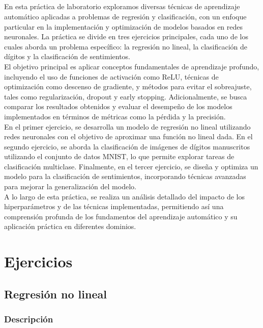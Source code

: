\documentclass{report}
\begin{document}
    \paragraph*{}
    {
      En esta práctica de laboratorio exploramos diversas técnicas de aprendizaje automático aplicadas a problemas de regresión y clasificación, con un enfoque particular en la implementación y optimización de modelos basados en redes neuronales. La práctica se divide en tres ejercicios principales, cada uno de los cuales aborda un problema específico: la regresión no lineal, la clasificación de dígitos y la clasificación de sentimientos.\\

      El objetivo principal es aplicar conceptos fundamentales de aprendizaje profundo, incluyendo el uso de funciones de activación como ReLU, técnicas de optimización como descenso de gradiente, y métodos para evitar el sobreajuste, tales como regularización, dropout y early stopping. Adicionalmente, se busca comparar los resultados obtenidos y evaluar el desempeño de los modelos implementados en términos de métricas como la pérdida y la precisión.\\

      En el primer ejercicio, se desarrolla un modelo de regresión no lineal utilizando redes neuronales con el objetivo de aproximar una función no lineal dada. En el segundo ejercicio, se aborda la clasificación de imágenes de dígitos manuscritos utilizando el conjunto de datos MNIST, lo que permite explorar tareas de clasificación multiclase. Finalmente, en el tercer ejercicio, se diseña y optimiza un modelo para la clasificación de sentimientos, incorporando técnicas avanzadas para mejorar la generalización del modelo.\\

      A lo largo de esta práctica, se realiza un análisis detallado del impacto de los hiperparámetros y de las técnicas implementadas, permitiendo así una comprensión profunda de los fundamentos del aprendizaje automático y su aplicación práctica en diferentes dominios.\\
    }
  \chapter{Ejercicios}
    \section{Regresión no lineal}
      \subsection*{Descripción}
\end{document}
